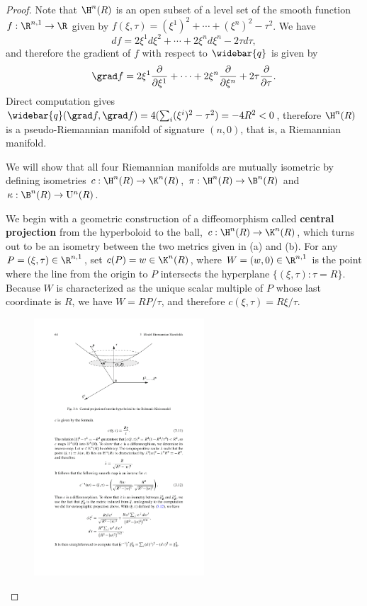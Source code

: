\begin{proof}
Note that $\H^n(R)$ is an open subset of a level set of the smooth function $f:\R^{n,1}\to\R$ given 
by $f(\xi,\tau)=(\xi^1)^2+\cdots+(\xi^n)^2-\tau^2$. We have
\[df=2\xi^1d\xi^2+\cdots+2\xi^nd\xi^n-2\tau d\tau,\]
and therefore the gradient of $f$ with respect to $\widebar{q}$ is given by
\begin{align}\label{Hyperbolic space defining grad}
\grad f=2\xi^1\frac{\partial}{\partial \xi^1}+\cdots+2\xi^n\frac{\partial}{\partial \xi^n}+2\tau\frac{\partial}{\partial \tau}.
\end{align}Direct computation gives $\widebar{q}(\grad f,\grad f)=4(\sum_i(\xi^i)^2-\tau^2)=-4R^2<0$, therefore $\H^n(R)$ 
is a pseudo-Riemannian manifold of signature $(n,0)$, that is, a Riemannian manifold.\par
We will show that all four Riemannian manifolds are mutually isometric by defining isometries 
$c:\H^n(R)\to\K^n(R)$, $\pi:\H^n(R)\to\B^n(R)$ and $\kappa:\B^n(R)\to\mathrm{U}^n(R)$.\par
We begin with a geometric construction of a diffeomorphism called \textbf{central projection} from the hyperboloid to the ball, $c:\H^n(R)\to\K^n(R)$, which turns out to be an isometry between the two metrics given in (a) and (b). For any $P=(\xi,\tau)\in\R^{n,1}$, set $c(P)=w\in\K^n(R)$, where $W=(w,0)\in\R^{n,1}$ is the point where the line from the origin to $P$ intersects the hyperplane $\{(\xi,\tau):\tau=R\}$. Because $W$ 
is characterized as the unique scalar multiple of $P$ whose last coordinate is $R$, we have $W=RP/\tau$, and therefore $c(\xi,\tau)=R\xi/\tau$.\par
\begin{figure}[htbp]
\centering
\includegraphics[width=180pt]{pictures/central-projection}

\end{figure}
\end{proof}
